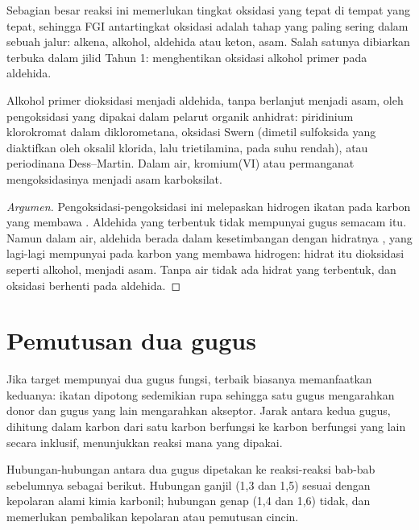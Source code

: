 Sebagian besar reaksi ini memerlukan tingkat oksidasi yang tepat di tempat
yang tepat, sehingga FGI antartingkat oksidasi adalah tahap yang paling
sering dalam sebuah jalur: alkena, alkohol, aldehida atau keton, asam. Salah
satunya dibiarkan terbuka dalam jilid Tahun 1: menghentikan oksidasi alkohol
primer pada aldehida.

\begin{proposition}\label{prop:b2:retrosynthesis:mild-oxidation}
Alkohol primer dioksidasi menjadi aldehida, tanpa berlanjut menjadi asam,
oleh pengoksidasi yang dipakai dalam pelarut organik anhidrat: piridinium
klorokromat dalam diklorometana, oksidasi Swern (dimetil sulfoksida yang
diaktifkan oleh oksalil klorida, lalu trietilamina, pada suhu rendah), atau
periodinana Dess--Martin. Dalam air, kromium(VI) atau permanganat
mengoksidasinya menjadi asam karboksilat.
\end{proposition}

\begin{proof}[Argumen]
Pengoksidasi-pengoksidasi ini melepaskan hidrogen ikatan  pada
karbon yang membawa . Aldehida yang terbentuk tidak mempunyai gugus
semacam itu. Namun dalam air, aldehida berada dalam kesetimbangan dengan
hidratnya , yang lagi-lagi mempunyai  pada karbon yang
membawa hidrogen: hidrat itu dioksidasi seperti alkohol, menjadi asam. Tanpa
air tidak ada hidrat yang terbentuk, dan oksidasi berhenti pada aldehida.
\end{proof}

\section{Pemutusan dua gugus}

Jika target mempunyai dua gugus fungsi,  terbaik biasanya
memanfaatkan keduanya: ikatan dipotong sedemikian rupa sehingga satu gugus
mengarahkan donor dan gugus yang lain mengarahkan akseptor. Jarak antara
kedua gugus, dihitung dalam karbon dari satu karbon berfungsi ke karbon
berfungsi yang lain secara inklusif, menunjukkan reaksi mana yang dipakai.

\begin{proposition}\label{prop:b2:retrosynthesis:patterns}
Hubungan-hubungan antara dua gugus dipetakan ke reaksi-reaksi bab-bab
sebelumnya sebagai berikut. Hubungan ganjil (1,3 dan 1,5) sesuai dengan
kepolaran alami kimia karbonil; hubungan genap (1,4
dan 1,6) tidak, dan memerlukan pembalikan kepolaran atau pemutusan cincin.
\end{proposition}


